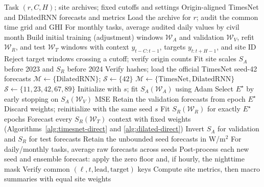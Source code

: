 \begin{algorithm}[!htbp]
\caption{Matched TimesNet--DilatedRNN preparation and refit}
\label{alg:matched-training}
\footnotesize
\begin{algorithmic}[1]
\Require Task $(r,C,H)$; site archives; fixed cutoffs and settings
\Ensure Origin-aligned TimesNet and DilatedRNN forecasts and metrics
\State Load the archive for $r$; audit the common time grid and GHI
\State For monthly tasks, average audited daily values by civil month
\State Build initial training (adjustment) windows $\mathcal W_A$
\Statex \hspace{\algorithmicindent}and validation $\mathcal W_V$, refit $\mathcal W_R$, and test $\mathcal W_T$ windows
\Statex \hspace{\algorithmicindent}with context $y_{t-C:t-1}$, targets $y_{t:t+H-1}$, and site ID
\State Reject target windows crossing a cutoff; verify origin counts
\State Fit site scales $S_A$ before 2023 and $S_R$ before 2024
  \State Verify hashes; load the official TimesNet seed-42 forecasts
  \State $\mathcal M\gets\{\mathrm{DilatedRNN}\}$; $\mathcal S\gets\{42\}$
\Else
  \State $\mathcal M\gets\{\mathrm{TimesNet,DilatedRNN}\}$
  \State $\mathcal S\gets\{11,23,42,67,89\}$
\EndIf
{}
  \State Initialize with $s$; fit $S_A(\mathcal W_A)$ using Adam
  \State Select $E^\star$ by early stopping on $S_A(\mathcal W_V)$ MSE
  \State Retain the validation forecasts from epoch $E^\star$
  \State Discard weights; reinitialize with the same seed $s$
  \State Fit $S_R(\mathcal W_R)$ for exactly $E^\star$ epochs
  \State Forecast every $S_R(\mathcal W_T)$ context with fixed weights
  \Statex \hspace{\algorithmicindent}(Algorithms~\ref{alg:timesnet-direct} and \ref{alg:dilated-direct})
  \State Invert $S_A$ for validation and $S_R$ for test forecasts
  \State Retain the unbounded seed forecasts in W/m$^2$
\EndFor
\State For daily/monthly tasks, average raw forecasts across seeds
\State Post-process each new seed and ensemble forecast:
\Statex \hspace{\algorithmicindent}apply the zero floor and, if hourly, the nighttime mask
\State Verify common $(\ell,t,\mathrm{lead},\mathrm{target})$ keys
\State Compute site metrics, then macro summaries with equal site weights
\end{algorithmic}
\end{algorithm}
